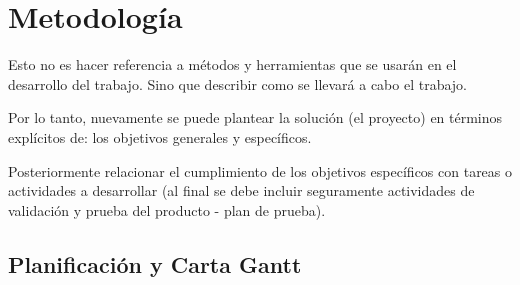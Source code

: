 \section{Metodología}
Esto no es hacer referencia a métodos y herramientas que se usarán en el desarrollo del trabajo. Sino que describir como se llevará a cabo el trabajo.

Por lo tanto, nuevamente se puede plantear la solución (el proyecto) en términos explícitos de: los objetivos generales y específicos.

Posteriormente relacionar el cumplimiento de los objetivos específicos con tareas o actividades a desarrollar (al final se debe incluir seguramente actividades de validación y prueba del producto - plan de prueba).


\subsection{Planificación y Carta Gantt}
\blindtext %

